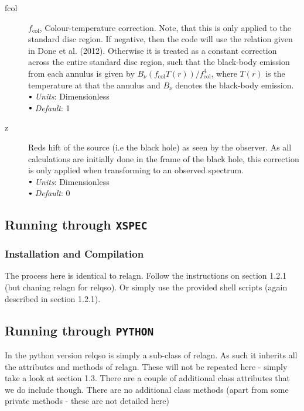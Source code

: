 \documentclass[a4paper, 11pt, times, onecolumn]{article}
\newcommand{\fcol}{f_{\mathrm{col}}}
\newcommand{\sbt}{\,\begin{picture}(-1,1)(-1,-3)\circle*{3}\end{picture}\ }
\begin{document}
\begin{description}
	
	\item[fcol] $\fcol$, Colour-temperature correction. Note, that this is only applied to the standard disc region. If negative, then the code will use the relation given in Done et al. (2012). Otherwise it is treated as a constant correction across the entire standard disc region, such that the black-body emission from each annulus is given by $B_{\nu}(\fcol T(r))/\fcol^{4}$, where $T(r)$ is the temperature at that the annulus and $B_{\nu}$ denotes the black-body emission.\\
		$\sbt$ {\it Units}: Dimensionless \\
		$\sbt$ {\it Default}: 1 
	
	
	\item[z] Reds
hift of the source (i.e the black hole) as seen by the observer. As all calculations are initially done in the frame of the black hole, this correction is only applied when transforming to an observed spectrum. \\
		$\sbt$ {\it Units}: Dimensionless \\
		$\sbt$ {\it Default}: 0
		
\end{description}



\subsection{Running through {\tt XSPEC}}

\subsubsection{Installation and Compilation}

The process here is identical to {\sc relagn}. Follow the instructions on section 1.2.1 (but chaning {\sc relagn} for {\sc relqso}). Or simply use the provided shell scripts (again described in section 1.2.1).


\subsection{Running through {\tt PYTHON}}

In the {\sc python} version {\sc relqso} is simply a sub-class of {\sc relagn}. As such it inherits all the attributes and methods of {\sc relagn}. These will not be repeated here - simply take a look at section 1.3.
There are a couple of additional class attributes that we do include though.
There are no additional class methods (apart from some private methods - these are not detailed here)
\end{document}
